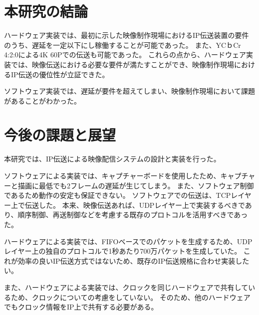 \section{本研究の結論}

ハードウェア実装では、最初に示した映像制作現場におけるIP伝送装置の要件のうち、遅延を一定以下にし稼働することが可能であった。
また、YCｂCr 4:2:0による4K 60Pでの伝送も可能であった。
これらの点から、ハードウェア実装では、映像伝送における必要な要件が満たすことができ、映像制作現場におけるIP伝送の優位性が立証できた。

ソフトウェア実装では、遅延が要件を超えてしまい、映像制作現場において課題があることがわかった。


\section{今後の課題と展望}

本研究では、IP伝送による映像配信システムの設計と実装を行った。

ソフトウェアによる実装では、キャプチャーボードを使用したため、キャプチャーと描画に最低でも2フレームの遅延が生じてしまう。
また、ソフトウェア制御であるため動作の安定も保証できない。
ソフトウェアでの伝送は、TCPレイヤー上で伝送した。
本来、映像伝送あれば、UDPレイヤー上で実装するべきであり、順序制御、再送制御などを考慮する既存のプロトコルを活用すべきであった。

ハードウェアによる実装では、FIFOベースでのパケットを生成するため、UDPレイヤー上の独自のプロトコルで1秒あたり700万パケットを生成していた。
これが効率の良いIP伝送方式ではないため、既存のIP伝送規格に合わせ実装したい。

また、ハードウェアによる実装では、クロックを同じハードウェアで共有しているため、クロックについての考慮をしていない。
そのため、他のハードウェアでもクロック情報をIP上で共有する必要がある。

